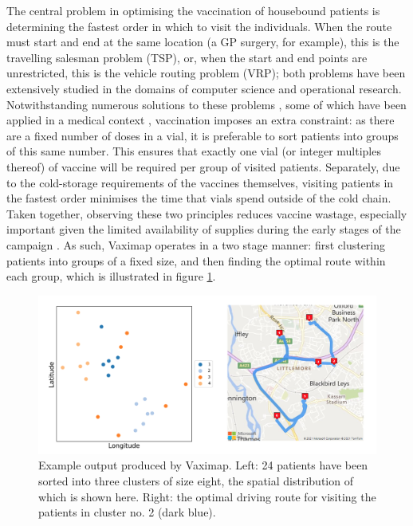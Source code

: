 \documentclass{article}
\def\vm{Vaximap}
\begin{document}
The central problem in optimising the vaccination of housebound patients is determining the fastest order in which to visit the individuals. When the route must start and end at the same location (a GP surgery, for example), this is the travelling salesman problem (TSP), or, when the start and end points are unrestricted, this is the vehicle routing problem (VRP); both problems have been extensively studied in the domains of computer science and operational research. Notwithstanding numerous solutions to these problems \cite{Laporte1990, laporteTravelingSalesmanProblem1992, braekersVehicleRoutingProblem2016, vidalConciseGuideExisting2020}, some of which have been applied in a medical context \cite{Shao2012}, vaccination imposes an extra constraint: as there are a fixed number of doses in a vial, it is preferable to sort patients into groups of this same number. This ensures that exactly one vial (or integer multiples thereof) of vaccine will be required per group of visited patients. Separately, due to the cold-storage requirements of the vaccines themselves, visiting patients in the fastest order minimises the time that vials spend outside of the cold chain. Taken together, observing these two principles reduces vaccine wastage, especially important given the limited availability of supplies during the early stages of the campaign \cite{NHSE_AZ}. As such, \vm{} operates in a two stage manner: first clustering patients into groups of a fixed size, and then finding the optimal route within each group, which is illustrated in figure \ref{demo}. 

\begin{figure}[H]
\centering
\includegraphics[width=\textwidth]{demo.png}
\caption{Example output produced by \vm{}. Left: 24 patients have been sorted into three clusters of size eight, the spatial distribution of which is shown here. Right: the optimal driving route for visiting the patients in cluster no. 2 (dark blue).}
\label{demo}
\end{figure}
\end{document}

